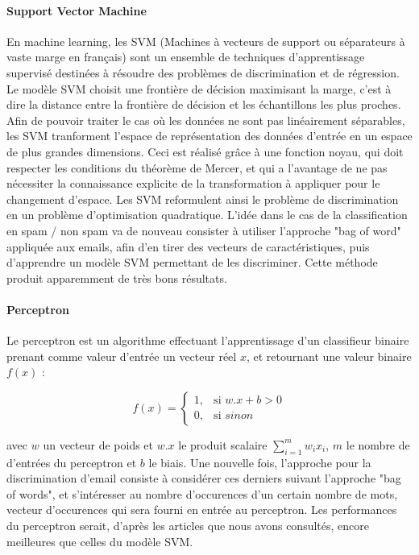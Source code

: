 \documentclass{report}
\begin{document}
\paragraph{Support Vector Machine}
En machine learning, les SVM (Machines à vecteurs de support ou séparateurs à vaste marge en français) sont un ensemble de techniques d'apprentissage supervisé destinées à résoudre des problèmes de discrimination et de régression. Le modèle SVM choisit une frontière de décision maximisant la marge, c'est à dire la distance entre la frontière de décision et les échantillons les plus proches. Afin de pouvoir traiter le cas où les données ne sont pas linéairement séparables, les SVM tranforment l'espace de représentation des données d'entrée en un espace de plus grandes dimensions. Ceci est réalisé grâce à une fonction noyau, qui doit respecter les conditions du théorème de Mercer, et qui a l'avantage de ne pas nécessiter la connaissance explicite de la transformation à appliquer pour le changement d'espace. Les SVM reformulent ainsi le problème de discrimination en un problème d'optimisation quadratique. L'idée dans le cas de la classification en spam / non spam va de nouveau consister à utiliser l'approche "bag of word" appliquée aux emails, afin d'en tirer des vecteurs de caractéristiques, puis d'apprendre un modèle SVM permettant de les discriminer. Cette méthode produit apparemment de très bons résultats.

\paragraph{Perceptron}
Le perceptron est un algorithme effectuant l'apprentissage d'un classifieur binaire prenant comme valeur d'entrée un vecteur réel $x$, et retournant une valeur binaire $f(x)$ :


$$f(x) =
    \begin{cases}
        1, & \text{si } w.x + b > 0 \\
        0, & \text{si } sinon
    \end{cases}
$$

avec $w$ un vecteur de poids et $w.x$ le produit scalaire $\sum_{i=1}^m w_i x_i$, $m$ le nombre de d'entrées du perceptron et $b$ le biais. Une nouvelle fois, l'approche pour la discrimination d'email consiste à considérer ces derniers suivant l'approche "bag of words", et s'intéresser au nombre d'occurences d'un certain nombre de mots, vecteur d'occurences qui sera fourni en entrée au perceptron. Les performances du perceptron serait, d'après les articles que nous avons consultés, encore meilleures que celles du modèle SVM.
\end{document}
